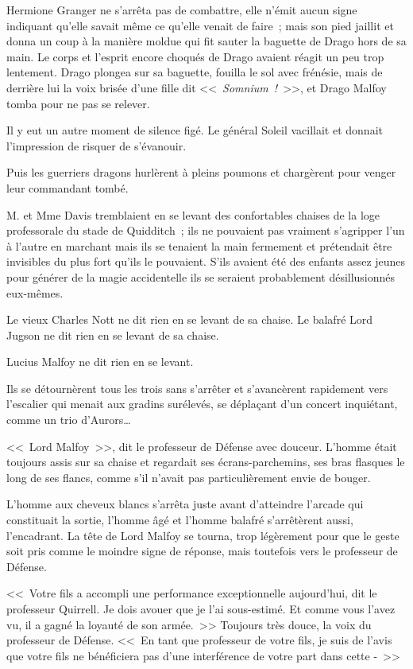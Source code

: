 Hermione Granger ne s'arrêta pas de combattre, elle n'émit aucun signe indiquant qu'elle savait même ce qu'elle venait de faire~; mais son pied jaillit et donna un coup à la manière moldue qui fit sauter la baguette de Drago hors de sa main. Le corps et l'esprit encore choqués de Drago avaient réagit un peu trop lentement. Drago plongea sur sa baguette, fouilla le sol avec frénésie, mais de derrière lui la voix brisée d'une fille dit <<~\emph{Somnium~!}~>>, et Drago Malfoy tomba pour ne pas se relever.

Il y eut un autre moment de silence figé. Le général Soleil vacillait et donnait l'impression de risquer de s'évanouir.

Puis les guerriers dragons hurlèrent à pleins poumons et chargèrent pour venger leur commandant tombé.

\later

M. et Mme Davis tremblaient en se levant des confortables chaises de la loge professorale du stade de Quidditch~; ils ne pouvaient pas vraiment s'agripper l'un à l'autre en marchant mais ils se tenaient la main fermement et prétendait être invisibles du plus fort qu'ils le pouvaient. S'ils avaient été des enfants assez jeunes pour générer de la magie accidentelle ils se seraient probablement désillusionnés eux-mêmes.

Le vieux Charles Nott ne dit rien en se levant de sa chaise. Le balafré Lord Jugson ne dit rien en se levant de sa chaise.

Lucius Malfoy ne dit rien en se levant.

Ils se détournèrent tous les trois sans s'arrêter et s'avancèrent rapidement vers l'escalier qui menait aux gradins surélevés, se déplaçant d'un concert inquiétant, comme un trio d'Aurors…

<<~Lord Malfoy~>>, dit le professeur de Défense avec douceur. L'homme était toujours assis sur sa chaise et regardait ses écrans-parchemins, ses bras flasques le long de ses flancs, comme s'il n'avait pas particulièrement envie de bouger.

L'homme aux cheveux blancs s'arrêta juste avant d'atteindre l'arcade qui constituait la sortie, l'homme âgé et l'homme balafré s'arrêtèrent aussi, l'encadrant. La tête de Lord Malfoy se tourna, trop légèrement pour que le geste soit pris comme le moindre signe de réponse, mais toutefois vers le professeur de Défense.

<<~Votre fils a accompli une performance exceptionnelle aujourd'hui, dit le professeur Quirrell. Je dois avouer que je l'ai sous-estimé. Et comme vous l'avez vu, il a gagné la loyauté de son armée.~>> Toujours très douce, la voix du professeur de Défense. <<~En tant que professeur de votre fils, je suis de l'avis que votre fils ne bénéficiera pas d'une interférence de votre part dans cette -~>>

